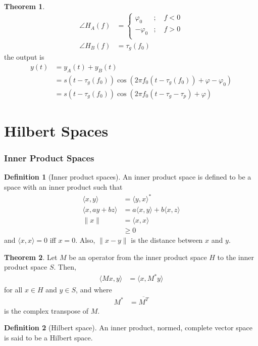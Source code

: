 \documentclass[titlepage, fleqn, a4paper, 12pt, twoside]{article}
\theoremstyle{definition}
\newtheorem{definition}{Definition}
\theoremstyle{theorem}
\newtheorem{theorem}{Theorem}
\begin{document}
\begin{theorem}
\begin{align*}
		\angle H_A(f) &=
			\begin{cases}
				\varphi_0 &;\quad f < 0\\
				-\varphi_0 &;\quad f > 0\\
			\end{cases}\\
		\angle H_B(f) &= \tau_g(f_0)
	\end{align*}
	the output is
	\begin{align*}
		y(t) &= y_A(t) + y_B(t)\\
		&= s\left( t - \tau_g(f_0) \right) \cos\left( 2 \pi f_0 \left( t - \tau_g(f_0) \right) + \varphi - \varphi_0 \right)\\
		&= s\left( t - \tau_g(f_0) \right) \cos\left( 2 \pi f_0 (t - \tau_g - \tau_p) + \varphi \right)
	\end{align*}
\end{theorem}

\clearpage
\part{Hilbert Spaces}

\section{Inner Product Spaces}

\begin{definition}[Inner product spaces]
	An inner product space is defined to be a space with an inner product such that
	\begin{align*}
		\langle x,y \rangle &= \langle y,x \rangle^*\\
		\langle x , a y + b z \rangle &= a \langle x,y \rangle + b \langle x,z \rangle\\
		\|x\| &= \langle x,x \rangle\\
		&\ge 0
	\end{align*}
	and $\langle x,x \rangle = 0$ iff $x = 0$.
	Also, $\|x - y\|$ is the distance between $x$ and $y$.
\end{definition}

\begin{theorem}
	Let $M$ be an operator from the inner product space $H$ to the inner product space $S$.
	Then,
	\begin{align*}
		\langle M x , y \rangle &= \langle x , M^* y \rangle
	\end{align*}
	for all $x \in H$ and $y \in S$, and where
	\begin{align*}
		M^* &= \overline{M^T}
	\end{align*}
	is the complex transpose of $M$.
\end{theorem}

\begin{definition}[Hilbert space]
	An inner product, normed, complete vector space is said to be a Hilbert space.
\end{definition}
\end{document}
